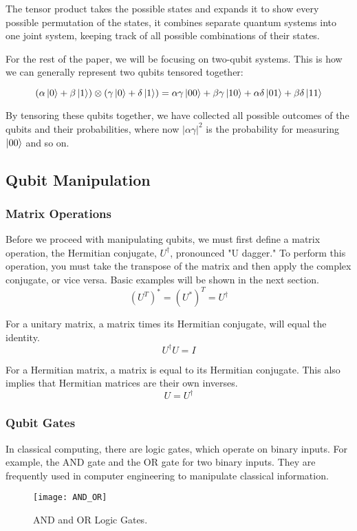 \documentclass[12pt]{article}
\begin{document}
The tensor product takes the possible states and expands it to show every possible permutation of the states, it combines separate quantum systems into one joint system, keeping track of all possible combinations of their states.

For the rest of the paper, we will be focusing on two-qubit systems. This is how we can generally represent two qubits tensored together:

$$
(\alpha\ket{0} + \beta\ket{1}) \otimes (\gamma\ket{0} + \delta\ket{1}) = \alpha \gamma \ket{00} + \beta \gamma \ket{10} + \alpha \delta \ket{01} +\beta \delta \ket{11}
$$

By tensoring these qubits together, we have collected all possible outcomes of the qubits and their probabilities, where now $|\alpha \gamma|^2$ is the probability for measuring $\ket{00}$ and so on.

\subsection{Qubit Manipulation}

\subsubsection{Matrix Operations}
Before we proceed with manipulating qubits, we must first define a matrix operation, the Hermitian conjugate, $U^\dagger$, pronounced "U dagger." To perform this operation, you must take the transpose of the matrix and then apply the complex conjugate, or vice versa. Basic examples will be shown in the next section.
$$
(U^{T})^{*} = (U^*)^T = U^\dagger
$$ 

For a unitary matrix, a matrix times its Hermitian conjugate, will equal the identity.
$$
U^{\dagger}U = I
$$

For a Hermitian matrix, a matrix is equal to its Hermitian conjugate. This also implies that Hermitian matrices are their own inverses.
$$
U = U^{\dagger}
$$

\subsubsection{Qubit Gates}

In classical computing, there are logic gates, which operate on binary inputs. For example, the AND gate and the OR gate for two binary inputs. They are frequently used in computer engineering to manipulate classical information.

\begin{figure}[h]
    \centering
    \texttt{[image: AND\_OR]}
    \caption{AND and OR Logic Gates.}
    \cite{AND_OR_Logic_Gates}
    \label{fig:AND_OR}
\end{figure}
\end{document}
